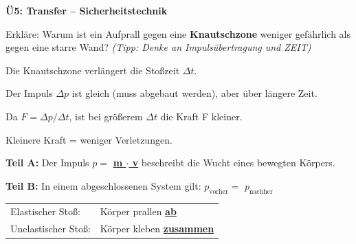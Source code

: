 \documentclass[11pt,a4paper]{article}
\newcommand{\lsg}[1]{\textcolor{loesung}{\underline{\textbf{#1}}}}
\newcommand{\lsgtext}[1]{\textcolor{loesung}{#1}}
\begin{document}
\textbf{Ü5: Transfer – Sicherheitstechnik}

\vspace{3mm}

Erkläre: Warum ist ein Aufprall gegen eine \textbf{Knautschzone} weniger gefährlich als gegen eine starre Wand? \textit{(Tipp: Denke an Impulsübertragung und ZEIT)}

\vspace{3pt}

\lsgtext{Die Knautschzone verlängert die Stoßzeit $\Delta t$.}

\lsgtext{Der Impuls $\Delta p$ ist gleich (muss abgebaut werden), aber über längere Zeit.}

\lsgtext{Da $F = \Delta p / \Delta t$, ist bei größerem $\Delta t$ die Kraft F kleiner.}

\lsgtext{Kleinere Kraft = weniger Verletzungen.}

\vspace{8mm}


\begin{kasten}[K7: Zusammenfassung]

\textbf{Teil A:} Der Impuls $p = $ \lsg{m $\cdot$ v} beschreibt die \glqq Wucht\grqq{} eines bewegten Körpers.

\vspace{5pt}

\textbf{Teil B:} In einem abgeschlossenen System gilt: $p_{\text{vorher}} = $ \lsg{$p_{\text{nachher}}$}

\vspace{5pt}

\begin{tabular}{@{}ll@{}}
Elastischer Stoß: & Körper prallen \lsg{ab} \\[0.3em]
Unelastischer Stoß: & Körper kleben \lsg{zusammen}
\end{tabular}

\end{kasten}
\end{document}

